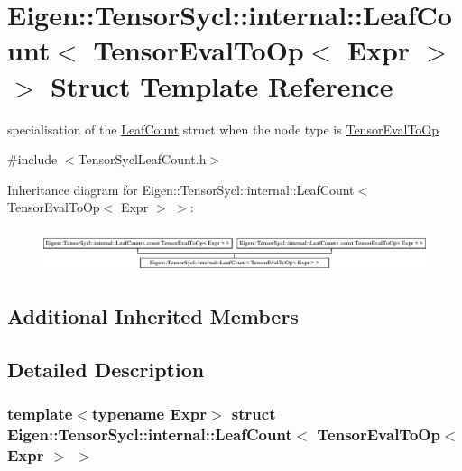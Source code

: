 \hypertarget{struct_eigen_1_1_tensor_sycl_1_1internal_1_1_leaf_count_3_01_tensor_eval_to_op_3_01_expr_01_4_01_4}{}\section{Eigen\+:\+:Tensor\+Sycl\+:\+:internal\+:\+:Leaf\+Count$<$ Tensor\+Eval\+To\+Op$<$ Expr $>$ $>$ Struct Template Reference}
\label{struct_eigen_1_1_tensor_sycl_1_1internal_1_1_leaf_count_3_01_tensor_eval_to_op_3_01_expr_01_4_01_4}


specialisation of the \hyperlink{struct_eigen_1_1_tensor_sycl_1_1internal_1_1_leaf_count}{Leaf\+Count} struct when the node type is \hyperlink{class_eigen_1_1_tensor_eval_to_op}{Tensor\+Eval\+To\+Op}  




{\ttfamily \#include $<$Tensor\+Sycl\+Leaf\+Count.\+h$>$}

Inheritance diagram for Eigen\+:\+:Tensor\+Sycl\+:\+:internal\+:\+:Leaf\+Count$<$ Tensor\+Eval\+To\+Op$<$ Expr $>$ $>$\+:\begin{figure}[H]
\begin{center}
\leavevmode
\includegraphics[height=1.278539cm]{struct_eigen_1_1_tensor_sycl_1_1internal_1_1_leaf_count_3_01_tensor_eval_to_op_3_01_expr_01_4_01_4}
\end{center}
\end{figure}
\subsection*{Additional Inherited Members}


\subsection{Detailed Description}
\subsubsection*{template$<$typename Expr$>$\newline
struct Eigen\+::\+Tensor\+Sycl\+::internal\+::\+Leaf\+Count$<$ Tensor\+Eval\+To\+Op$<$ Expr $>$ $>$}

